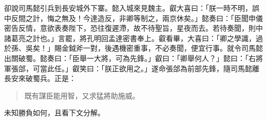 卻說司馬懿引兵到長安城外下寨。懿入城來見魏主。叡大喜曰：「朕一時不明，誤中反間之計，悔之無及！今達造反，非卿等制之，兩京休矣。」懿奏曰：「臣聞申儀密告反情，意欲表奏陛下，恐往復遲滯，故不待聖旨，星夜而去。若待奏聞，則中諸葛亮之計也。」言罷，將孔明回孟達密書奉上。叡看畢，大喜曰：「卿之學識，過於孫、吳矣！」賜金鉞斧一對，後遇機密重事，不必奏聞，便宜行事。就令司馬懿出關破蜀。懿奏曰：「臣舉一大將，可為先鋒。」叡曰：「卿舉何人？」懿曰：「右將軍張郃，可當此任。」叡笑曰：「朕正欲用之。」遂命張郃為前部先鋒，隨司馬懿離長安來破蜀兵。正是：

\begin{quote}
既有謀臣能用智，又求猛將助施威。
\end{quote}

未知勝負如何，且看下文分解。

